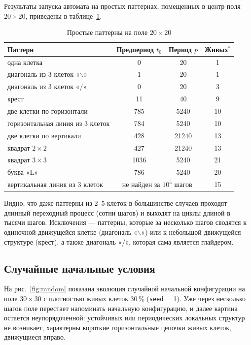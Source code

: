 Результаты запуска автомата на простых паттернах, помещенных в центр поля $20 \times 20$, приведены в таблице~\ref{tab:patterns}.

\begin{table}[H]
	\centering
	\caption{Простые паттерны на поле $20 \times 20$}
	\label{tab:patterns}
	\begin{tabular}{|l|c|c|c|}
		\hline
		Паттерн & Предпериод $t_0$ & Период $p$ & Живых$^*$ \\
		\hline
		одна клетка & 0 & 20 & 1 \\
		диагональ из 3 клеток «$\backslash$» & 1 & 20 & 1 \\
		диагональ из 3 клеток «/» & 0 & 20 & 3 \\
		крест & 11 & 40 & 9 \\
		две клетки по горизонтали & 785 & 5240 & 10 \\
		горизонтальная линия из 3 клеток & 784 & 5240 & 10 \\
		две клетки по вертикали & 428 & 21240 & 13 \\
		квадрат $2 \times 2$ & 427 & 21240 & 13 \\
		квадрат $3 \times 3$ & 1036 & 5240 & 21 \\
		буква «L» & 786 & 5240 & 20 \\
		вертикальная линия из 3 клеток & \multicolumn{2}{c|}{не найден за $10^5$ шагов} & 15 \\
		\hline
	\end{tabular}

	\smallskip
\end{table}

Видно, что даже паттерны из 2--5 клеток в большинстве случаев проходят длинный переходный процесс (сотни шагов) и выходят на циклы длиной в тысячи шагов. Исключения --- паттерны, которые за несколько шагов сводятся к одиночной движущейся клетке (диагональ «$\backslash$») или к небольшой движущейся структуре (крест), а также диагональ «/», которая сама является глайдером.

\subsection{Случайные начальные условия}

На рис.~\ref{fig:random} показана эволюция случайной начальной конфигурации на поле $30 \times 30$ с плотностью живых клеток 30\,\% (\texttt{seed} = 1). Уже через несколько шагов поле перестает напоминать начальную конфигурацию, и далее картина остается неупорядоченной: устойчивых или периодических локальных структур не возникает, характерны короткие горизонтальные цепочки живых клеток, движущиеся вправо.

